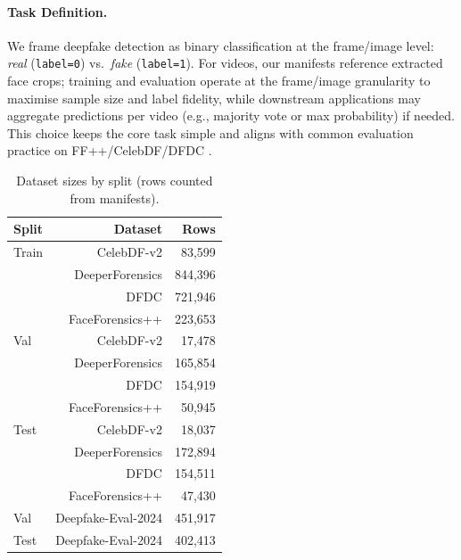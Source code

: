
\paragraph{Task Definition.} We frame deepfake detection as binary classification at the frame/image level: \emph{real} (\texttt{label=0}) vs.\ \emph{fake} (\texttt{label=1}). For videos, our manifests reference extracted face crops; training and evaluation operate at the frame/image granularity to maximise sample size and label fidelity, while downstream applications may aggregate predictions per video (e.g., majority vote or max probability) if needed. This choice keeps the core task simple and aligns with common evaluation practice on FF++/CelebDF/DFDC \cite{rossler2019faceforensicspp,li2020celebdf,dolhansky2020dfdc}.

\begin{table}[htbp]
  \centering
  \caption{Dataset sizes by split (rows counted from manifests).}
  \label{tab:dataset_sizes}
  {\small
  \begin{tabular}{lrr}
    \toprule
    Split & Dataset & Rows \\
    \midrule
    Train & CelebDF-v2 & 83{,}599 \\
          & DeeperForensics & 844{,}396 \\
          & DFDC & 721{,}946 \\
          & FaceForensics++ & 223{,}653 \\
    Val   & CelebDF-v2 & 17{,}478 \\
          & DeeperForensics & 165{,}854 \\
          & DFDC & 154{,}919 \\
          & FaceForensics++ & 50{,}945 \\
    Test  & CelebDF-v2 & 18{,}037 \\
          & DeeperForensics & 172{,}894 \\
          & DFDC & 154{,}511 \\
          & FaceForensics++ & 47{,}430 \\
    \midrule
    Val   & Deepfake-Eval-2024 & 451{,}917 \\
    Test  & Deepfake-Eval-2024 & 402{,}413 \\
    \bottomrule
  \end{tabular}}
\end{table}
\FloatBarrier

